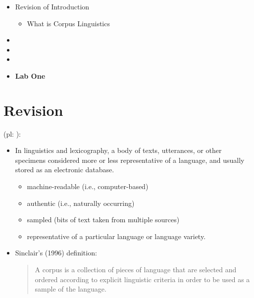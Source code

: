 \documentclass[a4paper,landscape,headrule,footrule,dvips]{foils}
\begin{document}
\begin{CJK}{UTF8}{min}
\maketitle



\begin{itemize} 
\item Revision of Introduction
  \begin{itemize}
  \item What is Corpus Linguistics
  \end{itemize}
\item {}
\item {}
\item {}
\item \textbf{Lab One}
\end{itemize}



\section{Revision}



 (pl: ):
\begin{itemize}
\item In linguistics and lexicography, a body of texts, utterances, or other
specimens considered more or less representative
of a language, and usually stored as an electronic
database. 
  \begin{itemize}
  \item machine-readable (i.e., computer-based)
  \item authentic (i.e., naturally occurring)
  \item sampled (bits of text taken from multiple sources)
  \item representative of a particular language or language variety.
  \end{itemize}
\item  Sinclair's (1996) definition:
  \begin{quote}
    A corpus is a collection of pieces of language that are selected and
    ordered according to explicit linguistic criteria in order to be used as a
    sample of the language.
\end{quote}
\end{itemize}



\end{CJK}
\end{document}
